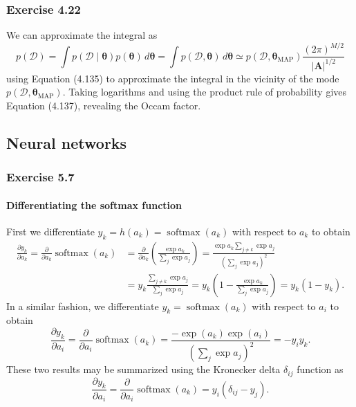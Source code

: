 \documentclass[12pt, a4paper]{article}
\newcommand{\D}{\mathcal{D}}
\newcommand{\vect}[1]{\bm{#1}}
\newcommand{\abs}[1]{\left\lvert#1\right\rvert}
\begin{document}
\subsubsection*{Exercise 4.22}
We can approximate the integral as
\begin{equation*}
	p(\D) = \int p( \D \mid \vect{\theta}) p(\vect{\theta}) \, d\vect{\theta}
	= \int p( \D , \vect{\theta}) \, d\vect{\theta}
	\simeq p( \D , \vect{\theta}_{\text{MAP}})  \frac{(2 \pi)^{M/2}}{\abs{\vect{A}}^{1/2}}
\end{equation*}
using Equation (4.135) to approximate the integral in the vicinity of the mode $p( \D , \vect{\theta}_{\text{MAP}})$.
Taking logarithms and using the product rule of probability gives Equation (4.137), revealing the Occam factor.

\subsection{Neural networks}
\subsubsection*{Exercise 5.7}
\paragraph{Differentiating the softmax function}
First we differentiate $y_k = h(a_k) = \operatorname{softmax}(a_k)$ with respect to $a_k$ to obtain
\begin{align*}
\frac{\partial y_k}{\partial a_k}
=
\frac{\partial }{\partial a_k} \operatorname{softmax}(a_k) 
&=
\frac{\partial }{\partial a_k} \left( \frac{\exp a_k}{\sum_j \exp a_j} \right)
=
\frac{\exp a_k \sum_{j \neq k} \exp a_j}{\left( \sum_j \exp a_j \right)^2}
\tag{product rule} \\
&= y_k  \frac{\sum_{j \neq k} \exp a_j}{ \sum_j \exp a_j}
= y_k \left( 1 - \frac{\exp a_k}{\sum_j \exp a_j} \right) = y_k (1 - y_k).
\end{align*}
In a similar fashion, we differentiate $y_k = \operatorname{softmax}(a_k)$ with respect to $a_i$ to obtain
\begin{equation*}
\frac{\partial y_k}{\partial a_i}
=
	\frac{\partial }{\partial a_i}  \operatorname{softmax}(a_k)
	=
	\frac{- \exp(a_k) \exp(a_i)}{\left( \sum_j \exp a_j \right)^2}
	= - y_i y_k.
\end{equation*}
These two results may be summarized using the Kronecker delta $\delta_{ij}$ function as
\begin{equation*}
	\frac{\partial y_k}{\partial a_i}
	=
	\frac{\partial }{\partial a_i}  \operatorname{softmax}(a_k)
	=  y_i \left( \delta_{ij} - y_j \right).
\end{equation*}
\end{document}
